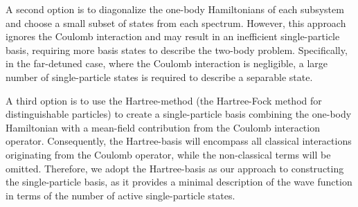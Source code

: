 \documentclass[twocolumn,superscriptaddress,unsortedaddress,
 amsmath,amssymb,
 aps,
]{revtex4-2}
\begin{document}
        A second option is to diagonalize the one-body Hamiltonians of each subsystem and choose a small subset of states from each spectrum. 
        However, this approach ignores the Coulomb interaction and may result in an inefficient single-particle basis, requiring more basis states to describe the two-body problem. 
        Specifically, in the far-detuned case, where the Coulomb interaction is negligible, a large number of single-particle states is required to describe a separable state.

        A third option is to use the Hartree-method (the Hartree-Fock method for distinguishable particles) to create a single-particle basis combining the one-body Hamiltonian with a mean-field contribution from the Coulomb interaction operator.
        Consequently, the Hartree-basis will encompass all classical interactions originating from the Coulomb operator, while the non-classical terms will be omitted.
        Therefore, we adopt the Hartree-basis as our approach to constructing the single-particle basis, as it provides a minimal description of the wave function in terms of the number of active single-particle states. %
\end{document}

